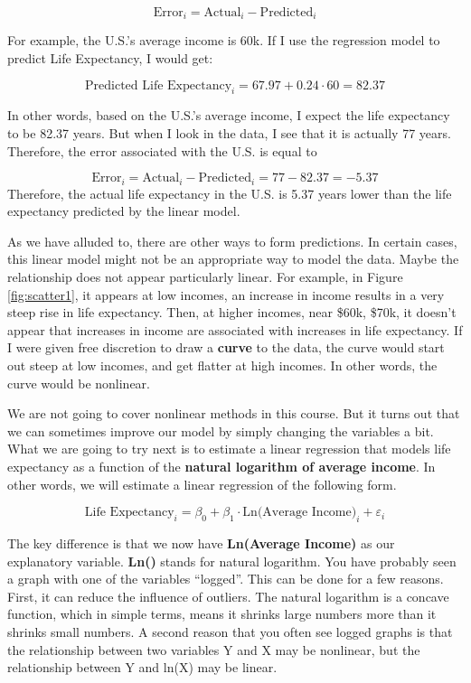 \documentclass[
]{book}
\begin{document}
\[
\text{Error}_i = \text{Actual}_i-\text{Predicted}_i
\]

For example, the U.S.'s average income is 60k. If I use the regression model to predict Life Expectancy, I would get:

\[
\text{Predicted Life Expectancy}_i = 67.97 + 0.24 \cdot 60 = 82.37
\]

In other words, based on the U.S.'s average income, I expect the life expectancy to be 82.37 years. But when I look in the data, I see that it is actually 77 years. Therefore, the error associated with the U.S. is equal to

\[
\text{Error}_i = \text{Actual}_i-\text{Predicted}_i = 77-82.37=-5.37
\]
Therefore, the actual life expectancy in the U.S. is 5.37 years lower than the life expectancy predicted by the linear model.

As we have alluded to, there are other ways to form predictions. In certain cases, this linear model might not be an appropriate way to model the data. Maybe the relationship does not appear particularly linear. For example, in Figure \ref{fig:scatter1}, it appears at low incomes, an increase in income results in a very steep rise in life expectancy. Then, at higher incomes, near \$60k, \$70k, it doesn't appear that increases in income are associated with increases in life expectancy. If I were given free discretion to draw a \textbf{curve} to the data, the curve would start out steep at low incomes, and get flatter at high incomes. In other words, the curve would be nonlinear.

We are not going to cover nonlinear methods in this course. But it turns out that we can sometimes improve our model by simply changing the variables a bit. What we are going to try next is to estimate a linear regression that models life expectancy as a function of the \textbf{natural logarithm of average income}. In other words, we will estimate a linear regression of the following form.

\[
\text{Life Expectancy}_i = \beta_0 + \beta_1 \cdot \text{Ln(Average Income)}_i + \varepsilon_i
\]

The key difference is that we now have \textbf{Ln(Average Income)} as our explanatory variable. \textbf{Ln()} stands for natural logarithm. You have probably seen a graph with one of the variables ``logged''. This can be done for a few reasons. First, it can reduce the influence of outliers. The natural logarithm is a concave function, which in simple terms, means it shrinks large numbers more than it shrinks small numbers. A second reason that you often see logged graphs is that the relationship between two variables Y and X may be nonlinear, but the relationship between Y and ln(X) may be linear.
\end{document}

